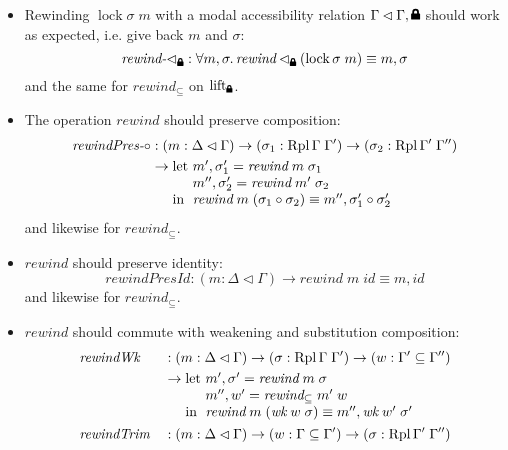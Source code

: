 \documentclass{article}
\newcommand{\lock}{
  \text{\tikz[baseline]{
      \fill[rounded corners=.1ex] (-.75ex,0) rectangle (.75ex,1ex);
      \draw[line width=.3ex] (-.4ex,.5ex) -- ++(0,.75ex) arc (180:0:.4ex) -- ++(0,-.75ex);
}}}
\begin{document}
\begin{itemize}
\item Rewinding $\operatorname{lock} \sigma \; m$
  with a modal accessibility relation $\Gamma \lhd \Gamma, \lock$
  should work as expected, i.e. give back $m$ and $\sigma$:
  $$ \textit{rewind-$\lhd_\lock$} : \forall m, \sigma. \, \textit{rewind} \lhd_\lock (\operatorname{lock} \sigma \; m) \equiv m , \sigma $$
  and the same for $\textit{rewind}_\subseteq$ on $\operatorname{lift_\lock}$.
\item The operation $\textit{rewind}$ should preserve composition:
  \begin{align*}
    \textit{rewindPres-$\circ$} &: (m : \Delta\lhd\Gamma) \rightarrow (\sigma_1 : \operatorname{Rpl} \Gamma \; \Gamma') \rightarrow (\sigma_2 : \operatorname{Rpl} \Gamma' \; \Gamma'') \\
    &\rightarrow
    \begin{array}[t]{@{}l@{}l@{}}
      \text{let } & m' , \sigma_1' = \textit{rewind} \; m \; \sigma_1 \\
      & m'' , \sigma_2' = \textit{rewind} \; m' \; \sigma_2 \\
      \text{in } & \textit{rewind} \; m \; (\sigma_1 \circ \sigma_2) \equiv m'' , \sigma_1' \circ \sigma_2'
    \end{array}
  \end{align*}
  and likewise for $\textit{rewind}_\subseteq$.
\item $\textit{rewind}$ should preserve identity:
  $$ \textit{rewindPresId} : (m : \Delta\lhd\Gamma) \rightarrow \textit{rewind} \; m \; id \equiv m , id $$
  and likewise for $\textit{rewind}_\subseteq$.
\item $\textit{rewind}$ should commute with weakening and substitution composition:
  \begin{align*}
    &\textit{rewindWk} &&: (m : \Delta\lhd\Gamma) \rightarrow (\sigma : \operatorname{Rpl} \Gamma \; \Gamma') \rightarrow (w : \Gamma' \subseteq \Gamma'') \\
    &&&\rightarrow
    \begin{array}[t]{@{}l@{}l@{}}
      \text{let } & m' , \sigma' = \textit{rewind} \; m \; \sigma \\
      & m'' , w' = \textit{rewind}_\subseteq \; m' \; w \\
      \text{in } & \textit{rewind} \; m \; (\textit{wk} \; w \; \sigma) \equiv m'' , \textit{wk} \; w' \; \sigma'
    \end{array} \\
    &\textit{rewindTrim} &&: (m : \Delta\lhd\Gamma) \rightarrow (w : \Gamma \subseteq \Gamma') \rightarrow (\sigma : \operatorname{Rpl} \Gamma' \; \Gamma'') \\

\end{align*}
\end{itemize}
\end{document}
